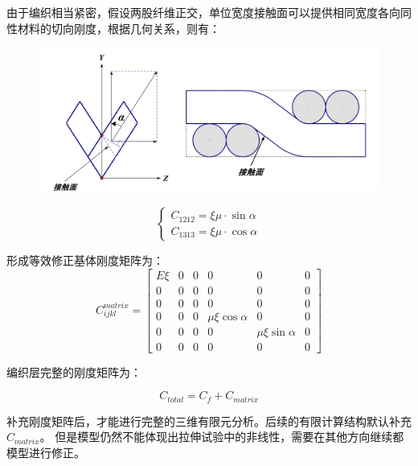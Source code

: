 由于编织相当紧密，假设两股纤维正交，单位宽度接触面可以提供相同宽度各向同性材料的切向刚度，根据几何关系，则有：

\begin{figure}[!htb]
	\centering
	\includegraphics[height=0.25\textheight]{figure/chap5/modified-matrix}
	\label{fig:modifiedmatrix}
\end{figure}

\begin{equation}
\left\{ {\begin{array}{*{20}{c}}
{{C_{1212}} = \xi \mu  \cdot \sin \alpha }\\
{{C_{1313}} = \xi \mu  \cdot \cos \alpha }
\end{array}} \right.
\end{equation}








形成等效修正基体刚度矩阵为：
\begin{equation}
C_{ijkl}^{matrix} = \left[ {\begin{array}{*{20}{c}}
	{E\xi }&0&0&0&0&0\\
	0&0&0&0&0&0\\
	0&0&0&0&0&0\\
	0&0&0&{\mu \xi \cos \alpha }&0&0\\
	0&0&0&0&{\mu \xi \sin \alpha }&0\\
	0&0&0&0&0&0
	\end{array}} \right]
\end{equation}


编织层完整的刚度矩阵为：


\begin{equation}
C_{total}= {C_f} + C_{matrix}
\end{equation}


补充刚度矩阵后，才能进行完整的三维有限元分析。后续的有限计算结构默认补充$ C_{matrix} $。
但是模型仍然不能体现出拉伸试验中的非线性，需要在其他方向继续都模型进行修正。


